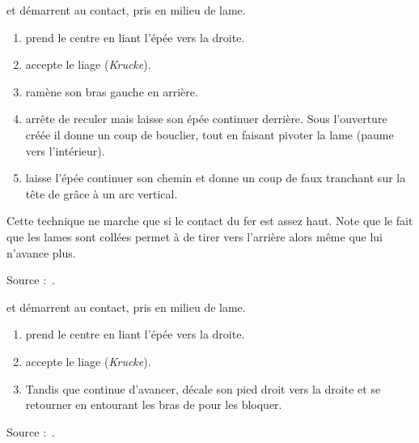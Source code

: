 \begin{technique}

\A et \D démarrent au contact, pris en milieu de lame.

\begin{enumerate}
	\item \A prend le centre en liant l'épée vers la droite.
	\item \D accepte le liage (\emph{Krucke}).
	\item \D ramène son bras gauche en arrière.
	\item \D arrête de reculer mais laisse son épée continuer derrière.
		Sous l'ouverture créée il donne un coup de bouclier, tout en faisant pivoter la lame (paume vers l'intérieur).
	\item \D laisse l'épée continuer son chemin et donne un coup de faux tranchant sur la tête de \A grâce à un arc vertical.
\end{enumerate}

Cette technique ne marche que si le contact du fer est assez haut.
Note que le fait que les lames sont collées permet à \D de tirer \A vers l'arrière alors même que lui n'avance plus.

Source :~\cite{fuhrmann:dijon:I33_liage:2015}.

\end{technique}


\begin{technique}

\A et \D démarrent au contact, pris en milieu de lame.

\begin{enumerate}
	\item \A prend le centre en liant l'épée vers la droite.
	\item \D accepte le liage (\emph{Krucke}).
	\item Tandis que \A continue d'avancer, \D décale son pied droit vers la droite et se retourner en entourant les bras de \A pour les bloquer.
\end{enumerate}


Source :~\cite{fuhrmann:dijon:I33_liage:2015}.

\end{technique}


